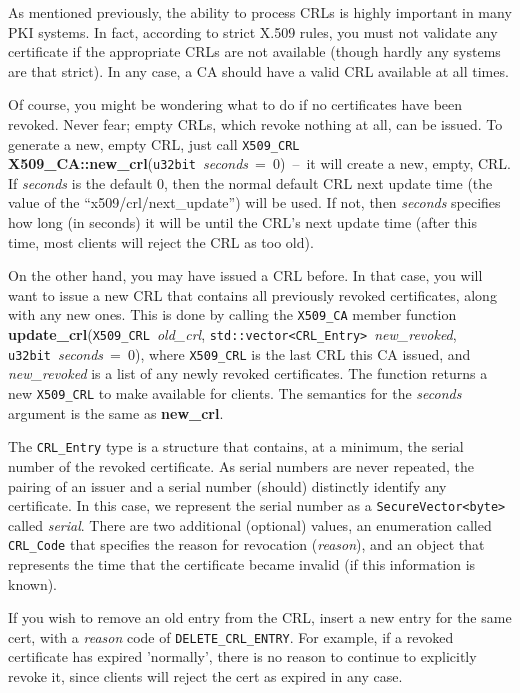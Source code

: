 \documentclass{article}
\newcommand{\function}[1]{\textbf{#1}}
\newcommand{\type}[1]{\texttt{#1}}
\renewcommand{\arg}[1]{\textsl{#1}}
\begin{document}
As mentioned previously, the ability to process CRLs is highly important in
many PKI systems. In fact, according to strict X.509 rules, you must not
validate any certificate if the appropriate CRLs are not available (though
hardly any systems are that strict). In any case, a CA should have a valid CRL
available at all times.

Of course, you might be wondering what to do if no certificates have
been revoked. Never fear; empty CRLs, which revoke nothing at all, can
be issued. To generate a new, empty CRL, just call \type{X509\_CRL}
\function{X509\_CA::new\_crl}(\type{u32bit}~\arg{seconds}~=~0)~--~it
will create a new, empty, CRL. If \arg{seconds} is the default 0, then
the normal default CRL next update time (the value of the
``x509/crl/next\_update'') will be used. If not, then \arg{seconds}
specifies how long (in seconds) it will be until the CRL's next update
time (after this time, most clients will reject the CRL as too old).

On the other hand, you may have issued a CRL before. In that case, you will
want to issue a new CRL that contains all previously revoked
certificates, along with any new ones. This is done by calling the
\type{X509\_CA} member function
\function{update\_crl}(\type{X509\_CRL}~\arg{old\_crl},
\type{std::vector<CRL\_Entry>}~\arg{new\_revoked},
\type{u32bit}~\arg{seconds}~=~0), where \type{X509\_CRL} is the last CRL this
CA issued, and \arg{new\_revoked} is a list of any newly revoked certificates.
The function returns a new \type{X509\_CRL} to make available for clients. The
semantics for the \arg{seconds} argument is the same as \function{new\_crl}.

The \type{CRL\_Entry} type is a structure that contains, at a minimum, the
serial number of the revoked certificate. As serial numbers are never repeated,
the pairing of an issuer and a serial number (should) distinctly identify any
certificate. In this case, we represent the serial number as a
\type{SecureVector<byte>} called \arg{serial}. There are two additional
(optional) values, an enumeration called \type{CRL\_Code} that specifies the
reason for revocation (\arg{reason}), and an object that represents the time
that the certificate became invalid (if this information is known).

If you wish to remove an old entry from the CRL, insert a new entry for the
same cert, with a \arg{reason} code of \type{DELETE\_CRL\_ENTRY}. For example,
if a revoked certificate has expired 'normally', there is no reason to continue
to explicitly revoke it, since clients will reject the cert as expired in any
case.
\end{document}
